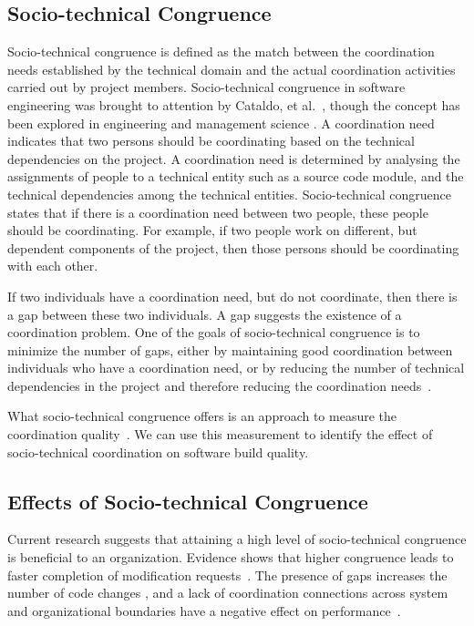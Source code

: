 \subsection{Socio-technical Congruence}
Socio-technical congruence is defined as the match between the coordination needs established by the technical domain and the actual coordination activities carried out by project members. Socio-technical congruence in software engineering was brought to attention by Cataldo, et al.~\cite{cataldo:cscw:2006}, though the concept has been explored in engineering \cite{browning2001} and management science \cite{henderson1990}. A coordination need indicates that two persons should be coordinating based on the technical dependencies on the project. A coordination need is determined by analysing the assignments of people to a technical entity such as a source code module, and the technical dependencies among the technical entities.
Socio-technical congruence states that if there is a coordination need between two people, these people should be coordinating.
For example, if two people work on different, but dependent components of the project, then those persons should be coordinating with each other.

If two individuals have a coordination need, but do not coordinate, then there is a gap between these two individuals. A gap suggests the existence of a coordination problem. One of the goals of socio-technical congruence is to minimize the number of gaps, either by maintaining good coordination between individuals who have a coordination need, or by reducing the number of technical dependencies in the project and therefore reducing the coordination needs~\cite{sarma2008:measuring_stc}.

What socio-technical congruence offers is an approach to measure the coordination quality~\cite{cataldo:cscw:2006}. We can use this measurement to identify the effect of socio-technical coordination on software build quality.





\subsection{Effects of Socio-technical Congruence}
Current research suggests that attaining a high level of socio-technical congruence is beneficial to an organization.
Evidence shows that higher congruence leads to faster completion of modification requests~\cite{cataldo:cscw:2006}. 
The presence of gaps increases the number of code changes \cite{ehrlich2008:gaps}, and a lack of coordination connections across system and organizational boundaries have a negative effect on performance~\cite{sosa2004:manage}.


